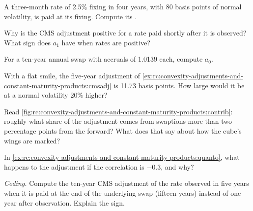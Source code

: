 \begin{exercise}[$\star$]\label{exo:rc:convexity-adjustments-and-constant-maturity-products:1}
A three-month rate of 2.5\% fixing in four years, with 80 basis points of normal
volatility, is paid at its fixing. Compute its .
\end{exercise}

\begin{exercise}[$\star$]\label{exo:rc:convexity-adjustments-and-constant-maturity-products:2}
Why is the CMS adjustment positive for a rate paid shortly after it is observed?
What sign does $a_1$ have when rates are positive?
\end{exercise}

\begin{exercise}[$\star$]\label{exo:rc:convexity-adjustments-and-constant-maturity-products:3}
For a ten-year annual swap with accruals of 1.0139 each, compute $a_0$.
\end{exercise}

\begin{exercise}[$\star\star$]\label{exo:rc:convexity-adjustments-and-constant-maturity-products:4}
With a flat smile, the five-year adjustment of \cref{ex:rc:convexity-adjustments-and-constant-maturity-products:cmsadj}
is 11.73 basis points. How large would it be at a normal volatility 20\% higher?
\end{exercise}

\begin{exercise}[$\star\star$]\label{exo:rc:convexity-adjustments-and-constant-maturity-products:5}
Read \cref{fig:rc:convexity-adjustments-and-constant-maturity-products:contrib}:
roughly what share of the adjustment comes from swaptions more than two
percentage points from the forward? What does that say about how the cube's
wings are marked?
\end{exercise}

\begin{exercise}[$\star\star$]\label{exo:rc:convexity-adjustments-and-constant-maturity-products:6}
In \cref{ex:rc:convexity-adjustments-and-constant-maturity-products:quanto}, what
happens to the adjustment if the correlation is $-0.3$, and why?
\end{exercise}

\begin{exercise}[$\star\star\star$]\label{exo:rc:convexity-adjustments-and-constant-maturity-products:7}
\emph{Coding.} Compute the ten-year CMS adjustment of the rate observed in five
years when it is paid at the end of the underlying swap (fifteen years) instead
of one year after observation. Explain the sign.
\end{exercise}

